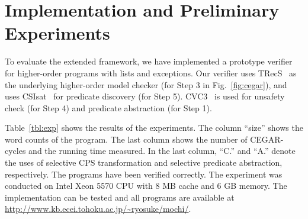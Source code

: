 \vspace{-2mm}

\section{Implementation and Preliminary Experiments}
\label{sec:experiments}

\vspace{-1mm}

To evaluate the extended framework, we have implemented a prototype
verifier for higher-order programs with lists and exceptions.
Our verifier uses TRecS~\cite{KobayashiPOPL2009,KobayashiPPDP2009} as
the underlying higher-order model checker (for Step 3 in
Fig.~\ref{fig:cegar}), and uses CSIsat~\cite{Beyer2008} for predicate
discovery (for Step 5).  CVC3~\cite{Barrett2007} is used for unsafety
check (for Step 4) and predicate abstraction (for Step 1).

Table~\ref{tbl:exp} shows the results of the experiments.  The column
``size'' shows the word counts of the program.  The last column shows
the number of CEGAR-cycles and the running time measured.  In the last
column, ``C.'' and ``A.'' denote the uses of selective CPS
transformation and selective predicate abstraction, respectively.  The
programs have been verified correctly.  The experiment was conducted on
Intel Xeon 5570 CPU with 8 MB cache and 6 GB memory.  The implementation
can be tested and all programs are available at
\url{http://www.kb.ecei.tohoku.ac.jp/~ryosuke/mochi/}.

